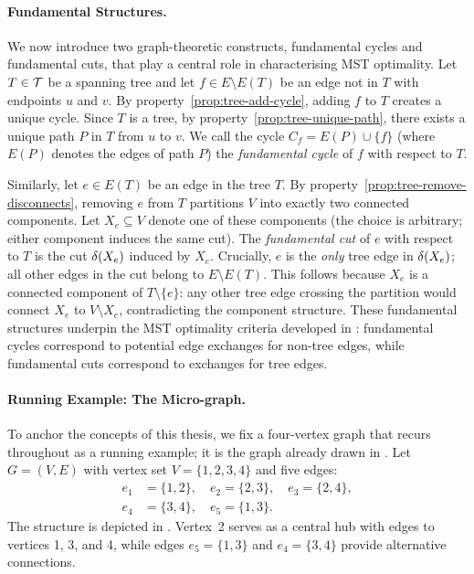 \paragraph{Fundamental Structures.}

We now introduce two graph-theoretic constructs, fundamental cycles and fundamental cuts, that play a central role in characterising MST optimality.
Let $T \in \mathcal{T}$ be a spanning tree and let $f \in E \setminus E(T)$ be an edge not in $T$ with endpoints $u$ and $v$.
By property~\ref{prop:tree-add-cycle}, adding $f$ to $T$ creates a unique cycle.
Since $T$ is a tree, by property~\ref{prop:tree-unique-path}, there exists a unique path $P$ in $T$ from $u$ to $v$.
We call the cycle $C_f = E(P) \cup \{f\}$ (where $E(P)$ denotes the edges of path $P$) the \emph{\textcolor{RWTHBlue}{fundamental cycle}} of $f$ with respect to $T$.

Similarly, let $e \in E(T)$ be an edge in the tree $T$.
By property~\ref{prop:tree-remove-disconnects}, removing $e$ from $T$ partitions $V$ into exactly two connected components.
Let $X_e \subseteq V$ denote one of these components (the choice is arbitrary; either component induces the same cut).
The \emph{\textcolor{RWTHBlue}{fundamental cut}} of $e$ with respect to $T$ is the cut $\delta(X_e)$ induced by $X_e$.
Crucially, $e$ is the \emph{only} tree edge in $\delta(X_e)$; all other edges in the cut belong to $E \setminus E(T)$.
This follows because $X_e$ is a connected component of $T \setminus \{e\}$: any other tree edge crossing the partition would connect $X_e$ to $V \setminus X_e$, contradicting the component structure.
These fundamental structures underpin the MST optimality criteria developed in : fundamental cycles correspond to potential edge exchanges for non-tree edges, while fundamental cuts correspond to exchanges for tree edges.

\paragraph{Running Example: The Micro-graph.}

To anchor the concepts of this thesis, we fix a four-vertex graph that recurs throughout as a running example; it is the graph already drawn in .
Let $G = (V, E)$ with vertex set $V = \{1, 2, 3, 4\}$ and five edges:
\begin{align*}
e_1 &= \{1, 2\}, \quad e_2 = \{2, 3\}, \quad e_3 = \{2, 4\}, \\
e_4 &= \{3, 4\}, \quad e_5 = \{1, 3\}.
\end{align*}%
The structure is depicted in .
Vertex~2 serves as a central hub with edges to vertices 1, 3, and 4, while edges $e_5 = \{1, 3\}$ and $e_4 = \{3, 4\}$ provide alternative connections.


